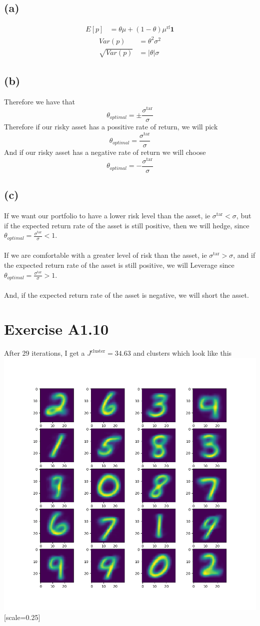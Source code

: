 \subsection*{(a)}
\begin{align*}
	E[p]&=\boxed{\theta\mu+(1-\theta)\mu^{\text{rf}}\textbf{1}}
\end{align*}
\begin{align*}
	Var(p)&=\theta^2\sigma^2\\
	\sqrt{Var(p)}&=\boxed{|\theta|\sigma}
\end{align*}
\subsection*{(b)}
Therefore we have that 
$$\theta_{optimal}=\pm \frac{\sigma^{\text{tar}}}{\sigma}$$
Therefore if our risky asset has a possitive rate of return, we will pick
$$\theta_{optimal}=\boxed{\frac{\sigma^{\text{tar}}}{\sigma}}$$
And if our risky asset has a negative rate of return we will choose
$$\theta_{optimal}=\boxed{-\frac{\sigma^{\text{tar}}}{\sigma}}$$
\subsection*{(c)}
If we want our portfolio to have a lower risk level than the asset, ie $\sigma^{\text{tar}}<\sigma$,
but if the expected return rate of the asset is still positive, then we will hedge,
since $\theta_{optimal}=\frac{\sigma^{\text{tar}}}{\sigma}<1$.\\\\
If we are comfortable with a greater level of risk than the asset, ie $\sigma^{\text{tar}}>\sigma$, and
if the expected return rate of the asset is still positive, we will Leverage
since $\theta_{optimal}=\frac{\sigma^{\text{tar}}}{\sigma}>1$.\\\\
And, if the expected return rate of the asset is negative, we will short the asset.
\section*{Exercise A1.10}
After 29 iterations, I get a $J^{\text{cluster}}=34.63$ and clusters which look like this
\includegraphics{digits.png}[scale=0.25]

